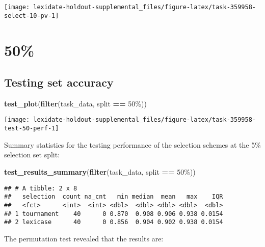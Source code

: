 \documentclass[
]{book}
\newenvironment{Shaded}{\begin{snugshade}}{\end{snugshade}}
\newcommand{\FunctionTok}[1]{\textcolor[rgb]{0.13,0.29,0.53}{\textbf{#1}}}
\newcommand{\NormalTok}[1]{#1}
\newcommand{\SpecialCharTok}[1]{\textcolor[rgb]{0.81,0.36,0.00}{\textbf{#1}}}
\newcommand{\StringTok}[1]{\textcolor[rgb]{0.31,0.60,0.02}{#1}}
\begin{document}
\texttt{[image: lexidate-holdout-supplemental\_files/figure-latex/task-359958-select-10-pv-1]}

\hypertarget{section-32}{%
\section{50\%}\label{section-32}}

\hypertarget{testing-set-accuracy-32}{%
\subsection{Testing set accuracy}\label{testing-set-accuracy-32}}

\begin{Shaded}
\begin{Highlighting}[]
\FunctionTok{test\_plot}\NormalTok{(}\FunctionTok{filter}\NormalTok{(task\_data, split }\SpecialCharTok{==} \StringTok{\textquotesingle{}50\%\textquotesingle{}}\NormalTok{))}
\end{Highlighting}
\end{Shaded}

\texttt{[image: lexidate-holdout-supplemental\_files/figure-latex/task-359958-test-50-perf-1]}

Summary statistics for the testing performance of the selection schemes at the 5\% selection set split:

\begin{Shaded}
\begin{Highlighting}[]
\FunctionTok{test\_results\_summary}\NormalTok{(}\FunctionTok{filter}\NormalTok{(task\_data, split }\SpecialCharTok{==} \StringTok{\textquotesingle{}50\%\textquotesingle{}}\NormalTok{))}
\end{Highlighting}
\end{Shaded}

\begin{verbatim}
## # A tibble: 2 x 8
##   selection  count na_cnt   min median  mean   max    IQR
##   <fct>      <int>  <int> <dbl>  <dbl> <dbl> <dbl>  <dbl>
## 1 tournament    40      0 0.870  0.908 0.906 0.938 0.0154
## 2 lexicase      40      0 0.856  0.904 0.902 0.938 0.0154
\end{verbatim}

The permutation test revealed that the results are:
\end{document}
